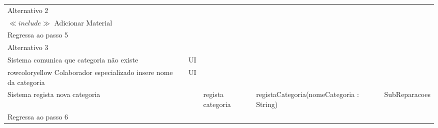 \documentclass[../relatorio.tex]{subfiles}
\begin{document}
\begin{landscape}
\begin{table}[!h]
\begin{tabular}{|p{5cm}|p{1cm}|p{4cm}|p{6cm}|p{3cm}|}
                     & 
            \\
            \hline
            \rowcolor{red!30}
            Alternativo 2 &                                                  &                  &     &            \\
            \hline
            $\ll include \gg$ Adicionar Material
                     & 
                     & 
                     & 
                     & 
            \\
            \hline
            Regressa ao passo 5
                     & 
                     & 
                     & 
                     & 
            \\
            \hline
            \rowcolor{red!30}
            Alternativo 3 &                                                  &                  &     &            \\
            \hline
            \rowcolor{yellow}
            Sistema comunica que categoria não existe 
                     & UI
                     & 
                     & 
                     & 
            \\
            \hline
            rowcolor{yellow}
            Colaborador especializado insere nome da categoria 
                     & UI
                     & 
                     & 
                     & 
            \\
            \hline
            Sistema regista nova categoria
                     & 
                     & regista categoria 
                     & registaCategoria(nomeCategoria : String)
                     & SubReparacoes
            \\
            \hline
            Regressa ao passo 6
                     & 
                     & 
                     & 
                     & 
            \\
            \hline
        \end{tabular}
    \end{table}
\end{landscape}
\end{document}
